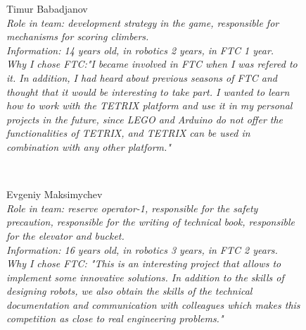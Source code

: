 \begin{figure}[H]
	\begin{minipage}{0.47\linewidth}
		Timur Babadjanov\\
		\emph{Role in team: development strategy in the game, responsible for mechanisms for scoring climbers.\\ }
		\emph{Information: 14 years old, in robotics 2 years, in FTC 1 year. \\ } 
		\emph{Why I chose FTC:"I became involved in FTC when I was refered to it. In addition, I had heard about previous seasons of FTC and thought that it would be interesting to take part. I wanted to learn how to work with the TETRIX platform and use it in my personal projects in the future, since LEGO and Arduino do not offer the functionalities of TETRIX, and TETRIX can be used in combination with any other platform."}		
	\end{minipage}
	\vfill
	\begin{minipage}{0.47\linewidth}
		\\
	\end{minipage}
\end{figure}

\begin{figure}[H]
	\begin{minipage}{0.47\linewidth}
		Evgeniy Maksimychev\\
		\emph{Role in team: reserve operator-1, responsible for the safety precaution, responsible for the writing of technical book, responsible for the elevator and bucket. \\}
		\emph{Information: 16 years old, in robotics 3 years, in FTC 2 years. \\}
		\emph{Why I chose FTC: "This is an interesting project that allows to implement some innovative solutions. In addition to the skills of designing robots, we also obtain the skills of the technical documentation and communication with colleagues which makes this competition as close to real engineering problems."}			
	\end{minipage}
	\hfill
	\begin{minipage}{0.47\linewidth}
		\\
	\end{minipage}	
\end{figure}

\fillpage


